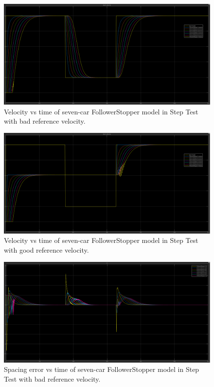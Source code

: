 \documentclass[conference]{IEEEtran}
\begin{document}
\begin{appendix}
\begin{figure}[htbp]
\centerline{\includegraphics[width=6.50 in]{multiFS_velbad.PNG}}
\caption{Velocity vs time of seven-car FollowerStopper model in Step Test with bad reference velocity.}
\label{stringvelbad}
\end{figure}

\begin{figure}[htbp]
\centerline{\includegraphics[width=6.50 in]{multiFS_velgood.PNG}}
\caption{Velocity vs time of seven-car FollowerStopper model in Step Test with good reference velocity.}
\label{stringvelgood}
\end{figure}

\begin{figure}[htbp]
\centerline{\includegraphics[width=6.50 in]{multiFS_errorbad.PNG}}
\caption{Spacing error vs time of seven-car FollowerStopper model in Step Test with bad reference velocity.}
\label{stringerrorbad}
\end{figure}


\end{appendix}
\end{document}
